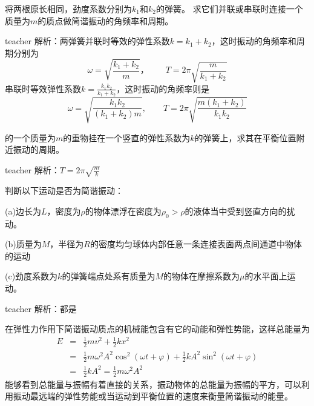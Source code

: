 \begin{example}
将两根原长相同，劲度系数分别为$k_1$和$k_2$的弹簧。
求它们并联或串联时连接一个质量为$m$的质点做简谐振动的角频率和周期。
\begin{taggedblock}{teacher}
\newline
解析：两弹簧并联时等效的弹性系数$k=k_1+k_2$，这时振动的角频率和周期分别为
\[
\omega = \sqrt{\frac{k_1+k_2}{m}}，\qquad T = 2\pi\sqrt{\frac{m}{k_1+k_2}}
\]
串联时等效弹性系数$k = \frac{k_1k_2}{k_1+k_2}$，这时振动的角频率则是
\[
\omega = \sqrt{\frac{k_1k_2}{(k_1+k_2)m}},\qquad T = 2\pi \sqrt{\frac{m(k_1+k_2)}{k_1k_2}}
\]
\end{taggedblock}
\end{example}

\begin{example}
的一个质量为$m$的重物挂在一个竖直的弹性系数为$k$的弹簧上，求其在平衡位置附近振动的周期。
\begin{taggedblock}{teacher}
\newline
解析：$T=2\pi\sqrt{\frac{m}{k}}$
\end{taggedblock}
\end{example}


\begin{example}
判断以下运动是否为简谐振动：

(a)边长为$L$，密度为$\rho$的物体漂浮在密度为$\rho_0>\rho$的液体当中受到竖直方向的扰动。

(b)质量为$M$，半径为$R$的密度均匀球体内部任意一条连接表面两点间通道中物体的运动

(c)劲度系数为$k$的弹簧端点处系有质量为$M$的物体在摩擦系数为$\mu$的水平面上运动。


\begin{taggedblock}{teacher}
\noindent
解析：都是
\end{taggedblock}
\end{example}



在弹性力作用下简谐振动质点的机械能包含有它的动能和弹性势能，这样总能量为
\begin{eqnarray}
E& =& \frac{1}{2}mv^2+\frac{1}{2}kx^2\nonumber\\
 &=& \frac{1}{2}m\omega^2A^2\cos^2(\omega t+\varphi)+\frac{1}{2}kA^2\sin^2(\omega t+\varphi)\nonumber\\
 &=&\frac{1}{2}kA^2 = \frac{1}{2}m\omega^2A^2
\end{eqnarray}
能够看到总能量与振幅有着直接的关系，振动物体的总能量为振幅的平方，可以利用振动最远端的弹性势能或当运动到平衡位置的速度来衡量简谐振动的能量。


